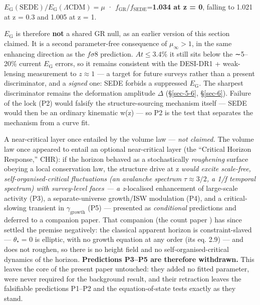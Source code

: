 \documentclass[preprint,12pt]{elsarticle}
\begin{document}
\(E_{\mathrm{G}}(\mathrm{SEDE})/E_{\mathrm{G}}(\Lambda \mathrm{CDM}) = \mu\)
· \(f_\mathrm{GR}/f_\mathrm{SEDE}\)=\textbf{1.034 at z = 0}, falling to
1.021 at z = 0.3 and 1.005 at z = 1.

\(E_{\mathrm{G}}\) is therefore \textbf{not} a shared GR null, as an
earlier version of this section claimed. It is a second parameter-free
consequence of \(\mu _\infty  > 1\), in the same enhancing direction as
the \(f\sigma 8\) prediction. \(At \leq 3.4\)\% it still sits below the
∼5--20\% current \(E_{\mathrm{G}}\) errors, so it remains consistent
with the DESI-DR1 + weak-lensing measurement to \(z \approx  1\)
\citep{Rauhut:2025eaz} --- a target for future surveys rather than a
present discriminator, and a \emph{signed} one: SEDE forbids a
suppressed \(E_{\mathrm{G}}\). The sharpest discriminator remains the
deformation amplitude \(\Delta\) (§\ref{sec-5-6}, §\ref{sec-6}). Failure
of the lock (P2) would falsify the structure-sourcing mechanism itself
--- SEDE would then be an ordinary kinematic w(z) --- so P2 is the test
that separates the mechanism from a curve fit.

A near-critical layer once entailed by the volume law --- \emph{not
claimed.} The volume law once appeared to entail an optional
near-critical layer (the ``Critical Horizon Response,'' CHR): if the
horizon behaved as a stochastically \emph{roughening} surface obeying a
local conservation law, the structure drive at z\emph{ would excite
scale-free, self-organised-critical fluctuations (an avalanche spectrum
\(\tau  \approx  3/2\), a 1/f temporal spectrum) with survey-level faces
--- a z}-localised enhancement of large-scale activity (P3), a
separate-universe growth/ISW modulation (P4), and a critical-slowing
transient in \(\gamma _{\mathrm{growth}}\) (P5) --- presented as
\emph{conditional} predictions and deferred to a companion paper. That
companion (the count paper \citep{Pandev:2026count}) has since settled
the premise negatively: the classical apparent horizon is
constraint-slaved --- \(\theta\)₊ = 0 is elliptic, with no growth
equation at any order (its eq. 2.9) --- and does not roughen, so there
is no height field and no self-organised-critical dynamics of the
horizon. \textbf{Predictions P3--P5 are therefore withdrawn.} This
leaves the core of the present paper untouched: they added no fitted
parameter, were never required for the background result, and their
retraction leaves the falsifiable predictions P1--P2 and the
equation-of-state tests exactly as they stand.
\end{document}
